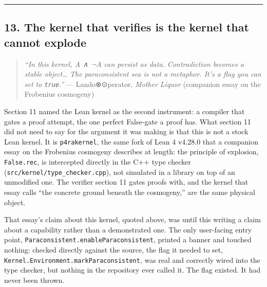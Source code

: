 \begin{center}\rule{0.5\linewidth}{0.5pt}\end{center}

\hypertarget{the-kernel-that-verifies-is-the-kernel-that-cannot-explode}{%
\subsection{13. The kernel that verifies is the kernel that cannot
explode}\label{the-kernel-that-verifies-is-the-kernel-that-cannot-explode}}

\begin{quote}
\emph{``In this kernel, A ∧ ¬A can persist as data. Contradiction
becomes a stable object\ldots{} The paraconsistent sea is not a
metaphor. It's a flag you can set to \texttt{true}.''} ---
Lando⊗⊙perator, \emph{Mother Liquor} (companion essay on the Frobenius
cosmogeny)
\end{quote}

Section 11 named the Lean kernel as the second instrument: a compiler
that gates a proof attempt, the one perfect False-gate a proof has. What
section 11 did not need to say for the argument it was making is that
this is not a stock Lean kernel. It is \texttt{p4rakernel}, the same
fork of Lean 4 v4.28.0 that a companion essay on the Frobenius cosmogeny
describes at length: the principle of explosion, \texttt{False.rec}, is
intercepted directly in the C++ type checker
(\texttt{src/kernel/type\_checker.cpp}), not simulated in a library on
top of an unmodified one. The verifier section 11 gates proofs with, and
the kernel that essay calls ``the concrete ground beneath the
cosmogeny,'' are the same physical object.

That essay's claim about this kernel, quoted above, was until this
writing a claim about a capability rather than a demonstrated one. The
only user-facing entry point,
\texttt{Paraconsistent.enableParaconsistent}, printed a banner and
touched nothing: checked directly against the source, the flag it needed
to set, \texttt{Kernel.Environment.markParaconsistent}, was real and
correctly wired into the type checker, but nothing in the repository
ever called it. The flag existed. It had never been thrown.

